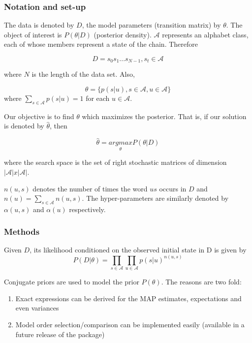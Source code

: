 \documentclass[
  nojss]{jss}
\providecommand{\tightlist}{%
  \setlength{\itemsep}{0pt}\setlength{\parskip}{0pt}}
\begin{document}
\hypertarget{notation-and-set-up}{%
\subsubsection{Notation and set-up}\label{notation-and-set-up}}

The data is denoted by \(D\), the model parameters (transition matrix) by \(\theta\). The object of interest is \(P(\theta | D)\) (posterior density). \(\mathcal{A}\) represents an alphabet class, each of whose members represent a state of the chain. Therefore

\[D = s_0 s_1 ... s_{N-1}, s_t \in \mathcal{A}\]

where \(N\) is the length of the data set. Also,

\[\theta = \{p(s|u), s \in \mathcal{A}, u \in \mathcal{A}  \}\]
where \(\sum_{s \in \mathcal{A}} p(s|u) = 1\) for each \(u \in \mathcal{A}\).

Our objective is to find \(\theta\) which maximizes the posterior. That is, if our solution is denoted by \(\hat{\theta}\), then

\[\hat{\theta} = \underset{\theta}{argmax}P(\theta | D)\]

where the search space is the set of right stochastic matrices of dimension \(|\mathcal{A}|x|\mathcal{A}|\).

\(n(u, s)\) denotes the number of times the word \(us\) occurs in \(D\) and \(n(u)=\sum_{s \in \mathcal{A}}n(u, s)\). The hyper-parameters are similarly denoted by \(\alpha(u, s)\) and \(\alpha(u)\) respectively.

\hypertarget{methods}{%
\subsubsection{Methods}\label{methods}}

Given \(D\), its likelihood conditioned on the observed initial state in D is given by
\[P(D|\theta) = \prod_{s \in \mathcal{A}} \prod_{u \in \mathcal{A}} p(s|u)^{n(u, s)}\]

Conjugate priors are used to model the prior \(P(\theta)\). The reasons are two fold:

\begin{enumerate}
\def\labelenumi{\arabic{enumi}.}
\tightlist
\item
  Exact expressions can be derived for the MAP estimates, expectations and even variances
\item
  Model order selection/comparison can be implemented easily (available in a future release of the package)
\end{enumerate}
\end{document}
